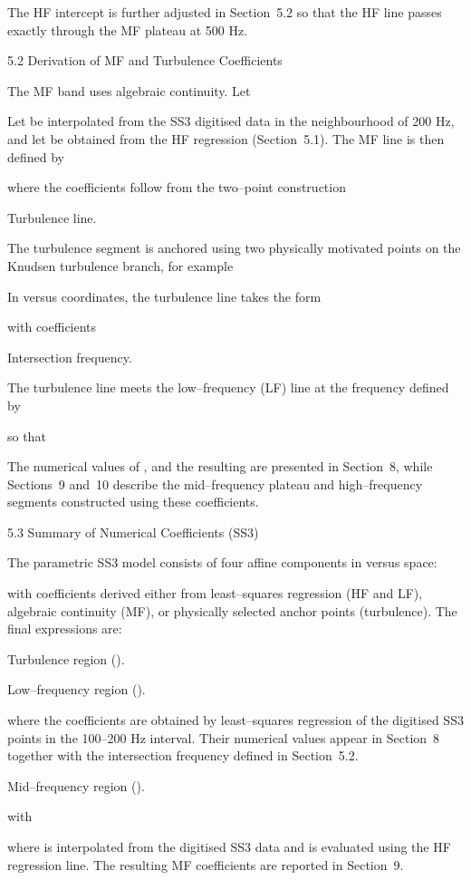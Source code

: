 \documentclass[12pt]{article}
\begin{document}
The HF intercept  is further adjusted in Section 5.2 so that the HF line passes exactly through the MF plateau at 500 Hz.

5.2 Derivation of MF and Turbulence Coefficients

The MF band uses algebraic continuity. Let


Let  be interpolated from the SS3 digitised data in the neighbourhood of 200 Hz, and let  be obtained from the HF regression (Section 5.1). The MF line is then defined by


where the coefficients follow from the two–point construction


Turbulence line.

The turbulence segment is anchored using two physically motivated points on the Knudsen turbulence branch, for example


In  versus  coordinates, the turbulence line takes the form


with coefficients


Intersection frequency.

The turbulence line meets the low–frequency (LF) line at the frequency  defined by


so that


The numerical values of ,  and the resulting  are presented in Section 8, while Sections 9 and 10 describe the mid–frequency plateau and high–frequency segments constructed using these coefficients.

5.3 Summary of Numerical Coefficients (SS3)

The parametric SS3 model consists of four affine components in  versus  space:


with coefficients derived either from least–squares regression (HF and LF), algebraic continuity (MF), or physically selected anchor points (turbulence). The final expressions are:

Turbulence region ().



Low–frequency region ().


where the coefficients  are obtained by least–squares regression of the digitised SS3 points in the 100–200 Hz interval. Their numerical values appear in Section 8 together with the intersection frequency  defined in Section 5.2.

Mid–frequency region ().


with


where  is interpolated from the digitised SS3 data and  is evaluated using the HF regression line. The resulting MF coefficients are reported in Section 9.
\end{document}
